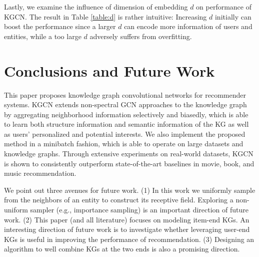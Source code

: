 \documentclass[sigconf]{acmart}
\begin{document}
			Lastly, we examine the influence of dimension of embedding $d$ on performance of KGCN.
			The result in Table \ref{table:d} is rather intuitive:
			Increasing $d$ initially can boost the performance since a larger $d$ can encode more information of users and entities, while a too large $d$ adversely suffers from overfitting.
			
			
	
\section{Conclusions and Future Work}
	This paper proposes knowledge graph convolutional networks for recommender systems.
	KGCN extends non-spectral GCN approaches to the knowledge graph by aggregating neighborhood information selectively and biasedly, which is able to learn both structure information and semantic information of the KG as well as users' personalized and potential interests.
	We also implement the proposed method in a minibatch fashion, which is able to operate on large datasets and knowledge graphs.
	Through extensive experiments on real-world datasets, KGCN is shown to consistently outperform state-of-the-art baselines in movie, book, and music recommendation.
	
	We point out three avenues for future work.
	(1) In this work we uniformly sample from the neighbors of an entity to construct its receptive field.
	Exploring a non-uniform sampler (e.g., importance sampling) is an important direction of future work.
	(2) This paper (and all literature) focuses on modeling item-end KGs.
	An interesting direction of future work is to investigate whether leveraging user-end KGs is useful in improving the performance of  recommendation.
	(3) Designing an algorithm to well combine KGs at the two ends is also a promising direction.


 
\end{document}
